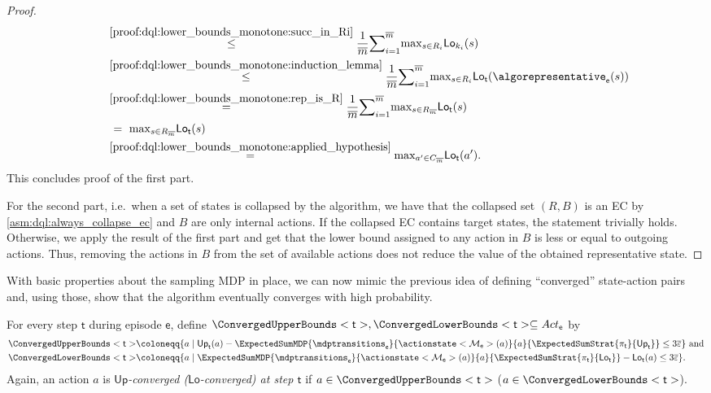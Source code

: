 \documentclass{article}
\newcommand{\MDP}{\mathcal{M}}
\newcommand{\Actions}{Act}
\newcommand{\strategy}{\pi}
\newcommand{\upperbound}{\mathsf{Up}}
\newcommand{\lowerbound}{\mathsf{Lo}}
\newcommand{\updatestep}{{\overline{\varepsilon}}}
\newcommand{\delay}{{\overline{m}}}
\newcommand{\algostep}{\mathsf{t}}
\newcommand{\algoepisode}{\mathsf{e}}
\begin{document}
\begin{proof}
\begin{align*}
		& \qquad \overset{\ref{proof:dql:lower_bounds_monotone:succ_in_Ri}}{~\leq~} \frac{1}{\delay} {\sum}_{i = 1}^\delay {\max}_{s \in R_i} \lowerbound_{k_i}(s) \\
		& \qquad \overset{\ref{proof:dql:lower_bounds_monotone:induction_lemma}}{~\leq~} \frac{1}{\delay} {\sum}_{i = 1}^\delay {\max}_{s \in R_i} \lowerbound_\algostep(\algorepresentative_\algoepisode(s)) \\
		& \qquad \overset{\ref{proof:dql:lower_bounds_monotone:rep_is_R}}{~=~} \frac{1}{\delay} {\sum}_{i = 1}^\delay {\max}_{s \in R_{\delay}} \lowerbound_\algostep(s) \\
		& \qquad ~=~ {\max}_{s \in R_{\delay}} \lowerbound_\algostep(s) \\
		& \qquad \overset{\ref{proof:dql:lower_bounds_monotone:applied_hypothesis}}{~=~} {\max}_{a' \in C_{\delay}} \lowerbound_\algostep(a').
	\end{align*}
	This concludes proof of the first part.

	For the second part, i.e.\ when a set of states is collapsed by the algorithm, we have that the collapsed set $(R, B)$ is an EC by \cref{asm:dql:always_collapse_ec} and $B$ are only internal actions.
	If the collapsed EC contains target states, the statement trivially holds.
	Otherwise, we apply the result of the first part and get that the lower bound assigned to any action in $B$ is less or equal to outgoing actions.
	Thus, removing the actions in $B$ from the set of available actions does not reduce the value of the obtained representative state. 
\end{proof}
With basic properties about the sampling MDP in place, we can now mimic the previous idea of defining \enquote{converged} state-action pairs and, using those, show that the algorithm eventually converges with high probability.
\begin{definition} \label{def:dql:converged_bounds}
	For every step $\algostep$ during episode $\algoepisode$, define $\ConvergedUpperBounds<\algostep>, \ConvergedLowerBounds<\algostep> \subseteq \Actions_{\algoepisode}$ by
	\begin{align*}
		\ConvergedUpperBounds<\algostep> & \coloneqq \{a \mid \upperbound_\algostep(a) - \ExpectedSumMDP{\mdptransitions_\algoepisode}{\actionstate<\MDP_\algoepisode>(a)}{a}{\ExpectedSumStrat{\strategy_\algostep}{\upperbound_\algostep}} \leq 3 \updatestep\} \text{ and}\\
		\ConvergedLowerBounds<\algostep> & \coloneqq \{a \mid \ExpectedSumMDP{\mdptransitions_\algoepisode}{\actionstate<\MDP_\algoepisode>(a)}{a}{\ExpectedSumStrat{\strategy_\algostep}{\lowerbound_\algostep}} - \lowerbound_\algostep(a) \leq 3 \updatestep\}.
	\end{align*}
	Again, an action $a$ is \emph{$\upperbound$-converged ($\lowerbound$-converged) at step $\algostep$} if $a \in \ConvergedUpperBounds<\algostep>$ ($a \in \ConvergedLowerBounds<\algostep>$).
\end{definition}
\end{document}
